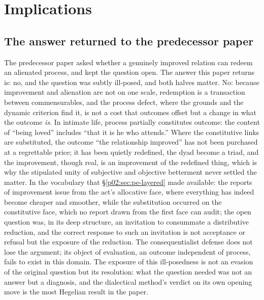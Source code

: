 \section{Implications}
\label{p02:sec:implications}

\subsection{The answer returned to the predecessor paper}
\label{p02:sec:implications-answer}

The predecessor paper asked whether a genuinely improved relation can redeem an alienated process, and kept the question open. The answer this paper returns is: no, and the question was subtly ill-posed, and both halves matter. No: because improvement and alienation are not on one scale, redemption is a transaction between commensurables, and the process defect, where the grounds and the dynamic criterion find it, is not a cost that outcomes offset but a change in what the outcome \emph{is}. In intimate life, process partially constitutes outcome: the content of ``being loved'' includes ``that it is he who attends.'' Where the constitutive links are substituted, the outcome ``the relationship improved'' has not been purchased at a regrettable price; it has been quietly redefined, the dyad become a triad, and the improvement, though real, is an improvement of the redefined thing, which is why the stipulated unity of subjective and objective betterment never settled the matter. In the vocabulary that \S\ref{p02:sec:pe-layered} made available: the reports of improvement issue from the act's allocative face, where everything has indeed become cheaper and smoother, while the substitution occurred on the constitutive face, which no report drawn from the first face can audit; the open question was, in its deep structure, an invitation to consummate a distributive reduction, and the correct response to such an invitation is not acceptance or refusal but the exposure of the reduction. The consequentialist defense does not lose the argument; its object of evaluation, an outcome independent of process, fails to exist in this domain. The exposure of this ill-posedness is not an evasion of the original question but its resolution: what the question needed was not an answer but a diagnosis, and the dialectical method's verdict on its own opening move is the most Hegelian result in the paper.

